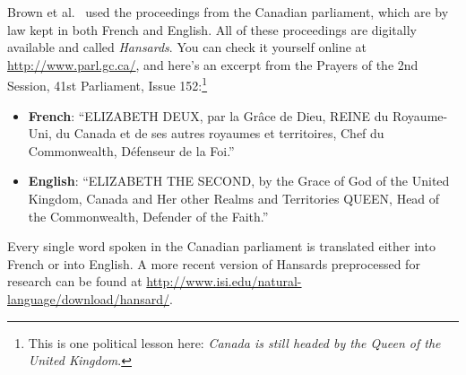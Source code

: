 \documentclass{report}
\begin{document}
Brown et al.~\cite{brown1990statistical} used the proceedings from the Canadian
parliament, which are by law kept in both French and English. All of these
proceedings are digitally available and called {\em Hansards}. You can check it
yourself online at \url{http://www.parl.gc.ca/}, and here's an excerpt from the
Prayers of the 2nd Session, 41st Parliament, Issue 152:\footnote{
    This is one political lesson here: {\em Canada is still headed by the Queen of
    the United Kingdom}.
}
\begin{itemize}
    \itemsep 0em
    \item {\bf French}: ``ELIZABETH DEUX, par la Grâce de Dieu, REINE du
        Royaume-Uni, du Canada et de ses autres royaumes et territoires, Chef du
        Commonwealth, D\'efenseur de la Foi.''
    \item {\bf English}: ``ELIZABETH THE SECOND, by the Grace of God of the
        United Kingdom, Canada and Her other Realms and Territories QUEEN, Head
        of the Commonwealth, Defender of the Faith.''
\end{itemize}
Every single word spoken in the Canadian parliament is translated either into
French or into English. A more recent version of Hansards preprocessed for
research can be found at
\url{http://www.isi.edu/natural-language/download/hansard/}.
\end{document}
